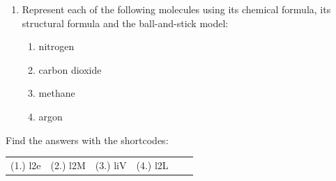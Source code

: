 \begin{enumerate}[noitemsep, label=\textbf{\arabic*}. ]
        \item Represent each of the following molecules using its chemical formula, its structural formula and the ball-and-stick model:
\label{m38120*id524}\begin{enumerate}[noitemsep, label=\textbf{\alph*}. ] 
            \item nitrogen\item carbon dioxide\item methane\item argon\end{enumerate}
                
\end{enumerate}
        


    
  \label{m38120**end}
    
\par {} Find the answers with the shortcodes:
 \par \begin{tabular}[h]{cccccc}
 (1.) l2e  &  (2.) l2M  &  (3.) liV  &  (4.) l2L  & \end{tabular}




